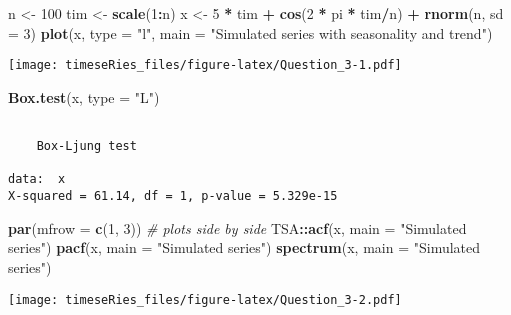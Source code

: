 \documentclass[]{book}
\newenvironment{Shaded}{\begin{snugshade}}{\end{snugshade}}
\newcommand{\KeywordTok}[1]{\textcolor[rgb]{0.13,0.29,0.53}{\textbf{#1}}}
\newcommand{\DataTypeTok}[1]{\textcolor[rgb]{0.13,0.29,0.53}{#1}}
\newcommand{\DecValTok}[1]{\textcolor[rgb]{0.00,0.00,0.81}{#1}}
\newcommand{\StringTok}[1]{\textcolor[rgb]{0.31,0.60,0.02}{#1}}
\newcommand{\CommentTok}[1]{\textcolor[rgb]{0.56,0.35,0.01}{\textit{#1}}}
\newcommand{\OperatorTok}[1]{\textcolor[rgb]{0.81,0.36,0.00}{\textbf{#1}}}
\newcommand{\NormalTok}[1]{#1}
\begin{document}
\begin{Shaded}
\begin{Highlighting}[]
\NormalTok{n <-}\StringTok{ }\DecValTok{100}
\NormalTok{tim <-}\StringTok{ }\KeywordTok{scale}\NormalTok{(}\DecValTok{1}\OperatorTok{:}\NormalTok{n)}
\NormalTok{x <-}\StringTok{ }\DecValTok{5} \OperatorTok{*}\StringTok{ }\NormalTok{tim }\OperatorTok{+}\StringTok{ }\KeywordTok{cos}\NormalTok{(}\DecValTok{2} \OperatorTok{*}\StringTok{ }\NormalTok{pi }\OperatorTok{*}\StringTok{ }\NormalTok{tim}\OperatorTok{/}\NormalTok{n) }\OperatorTok{+}\StringTok{ }\KeywordTok{rnorm}\NormalTok{(n, }\DataTypeTok{sd =} \DecValTok{3}\NormalTok{)}
\KeywordTok{plot}\NormalTok{(x, }\DataTypeTok{type =} \StringTok{"l"}\NormalTok{, }\DataTypeTok{main =} \StringTok{"Simulated series with seasonality and trend"}\NormalTok{)}
\end{Highlighting}
\end{Shaded}

\texttt{[image: timeseRies\_files/figure-latex/Question\_3-1.pdf]}

\begin{Shaded}
\begin{Highlighting}[]
\KeywordTok{Box.test}\NormalTok{(x, }\DataTypeTok{type =} \StringTok{"L"}\NormalTok{)}
\end{Highlighting}
\end{Shaded}

\begin{verbatim}

    Box-Ljung test

data:  x
X-squared = 61.14, df = 1, p-value = 5.329e-15
\end{verbatim}

\begin{Shaded}
\begin{Highlighting}[]
\KeywordTok{par}\NormalTok{(}\DataTypeTok{mfrow =} \KeywordTok{c}\NormalTok{(}\DecValTok{1}\NormalTok{, }\DecValTok{3}\NormalTok{))  }\CommentTok{# plots side by side}
\NormalTok{TSA}\OperatorTok{::}\KeywordTok{acf}\NormalTok{(x, }\DataTypeTok{main =} \StringTok{"Simulated series"}\NormalTok{)}
\KeywordTok{pacf}\NormalTok{(x, }\DataTypeTok{main =} \StringTok{"Simulated series"}\NormalTok{)}
\KeywordTok{spectrum}\NormalTok{(x, }\DataTypeTok{main =} \StringTok{"Simulated series"}\NormalTok{)}
\end{Highlighting}
\end{Shaded}

\texttt{[image: timeseRies\_files/figure-latex/Question\_3-2.pdf]}
\end{document}
